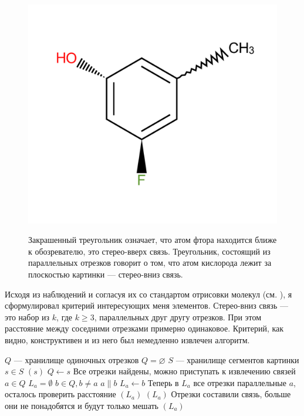 \begin{figure}
\centering
{\includegraphics[scale=0.4, clip, trim = 15mm 10mm 15mm 10mm]{img/stereo.pdf}}
\caption{Закрашенный треугольник означает, что атом фтора находится ближе к обозревателю, это стерео-вверх связь. 
Треугольник, состоящий из параллельных отрезков говорит о том, что атом кислорода лежит за плоскостью картинки --- стерео-вниз связь.}
\end{figure} 

\noindent
Исходя из наблюдений и согласуя их со стандартом отрисовки молекул (см. \cite{iupac}), я сформулировал критерий интересующих меня
элементов. Стерео-вниз связь --- это набор из $k$, где $k \ge 3$, параллельных друг другу отрезков. При этом расстояние между
соседними отрезками примерно одинаковое. Критерий, как видно, конструктивен и из него был немедленно извлечен алгоритм.  

\begin{codebox}
  \li \Comment $Q$ --- хранилище одиночных отрезков
  \li $Q = \varnothing$
  \li
  \li \Comment $S$ --- хранилище сегментов картинки  
  \li \For $s \in S$ 	
  \li \Do \If {}$(s)$
  \li   	\Then $Q \gets s$
  \li \End \End
  \li \Comment Все отрезки найдены, можно приступать к извлечению связей
  \li \For $a \in Q$
  \li \Do $L_{a} = \emptyset $ 
  \li \For $b \in Q, b \ne a$ 
  \li \Do \If $ a \parallel b $
  \li \Then $L_{a} \gets b$
  \li \End \End 
  \li \Comment Теперь в $L_{a}$ все отрезки параллельные $a$, осталось проверить расстояние
  \li \If {}$(L_{a})$
  \li \Then {}$(L_{a})$
  \li \Comment Отрезки составили связь, больше они не понадобятся и будут только мешать
  \li {}$(L_{a})$
\end{codebox}

